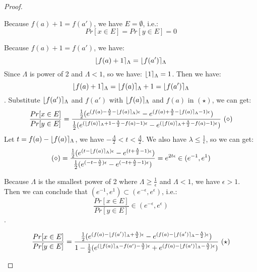 \documentclass[a4paper,11pt]{article}
\begin{document}
\begin{proof}
\begin{itemize}
\begin{itemize}
	Because $f(a) + 1 = f(a')$, we have $E = \emptyset$, i.e.:
	$$Pr[x \in E] = Pr[y \in E] = 0$$ 
	
	Because $f(a) + 1 = f(a')$, we have:
	$$\lfloor f(a) + 1 \rceil_{\Lambda} = \lfloor f(a') \rceil_{\Lambda}$$
	Since $\Lambda$ is power of 2 and $\Lambda < 1$, so we have: $\lfloor 1 \rceil_{\Lambda} = 1$. Then we have:
	$$\lfloor f(a) + 1 \rceil_{\Lambda} = \lfloor f(a) \rceil_{\Lambda} + 1 = \lfloor f(a') \rceil_{\Lambda} $$.
	Substitute $\lfloor f(a') \rceil_{\Lambda}$ and $f(a')$ with $\lfloor f(a) \rceil_{\Lambda}$ and $f(a)$ in $(\star)$, we can get:
	\[
	\frac{Pr[x \in E]}{Pr[y \in E]} 
	= \frac{
			\frac{1}{2}(
				e^{(f(a) - \frac{\Lambda}{2} - \lfloor f(a) \rceil_{\Lambda})\epsilon}
				- e^{(f(a) + \frac{\Lambda}{2} - \lfloor f(a) \rceil_{\Lambda} - 1)\epsilon})
			}
			{
			\frac{1}{2}(
				e^{(\lfloor f(a) \rceil_{\Lambda} + 1 - \frac{\Lambda}{2} - f(a) - 1)\epsilon}
				- e^{(\lfloor f(a) \rceil_{\Lambda} + \frac{\Lambda}{2}  - f(a) - 1)\epsilon})
			}~(\diamond) 
	\]
	Let $t = f(a) - \lfloor f(a) \rceil_{\Lambda}$, we have $-\frac{\Lambda}{2} < t < \frac{\Lambda}{2}$. We also have $\lambda \leq \frac{1}{\epsilon}$, so we can get:
	\[
	(\diamond) = 
	\frac{
		\frac{1}{2}(
			e^{(t - \lfloor f(a) \rceil_{\Lambda})\epsilon}
			- e^{(t + \frac{\Lambda}{2} - 1)\epsilon})
		}
		{
		\frac{1}{2}(
			e^{(-t - \frac{\Lambda}{2})\epsilon}
			- e^{(-t + \frac{\Lambda}{2} - 1)\epsilon})
		}
	= e^{2t\epsilon} \in (e^{-1}, e^1)
	\]
	
	Because $\Lambda$ is the smallest power of 2 where $\Lambda \geq \frac{1}{\epsilon}$ and $\Lambda < 1$, we have $\epsilon > 1$.
	Then we can conclude that $(e^{-1}, e^1) \subset (e^{-\epsilon}, e^{\epsilon})$, i.e.:
	$$\frac{Pr[x \in E]}{Pr[y \in E]} \in (e^{-\epsilon}, e^{\epsilon}) $$.
	\end{itemize}
	\[
	\frac{Pr[x \in E]}{Pr[y \in E]} 
	= \frac{
			\frac{1}{2}(
				e^{(f(a) - \round{f(a')}_{\Lambda} + \frac{\Lambda}{2})\epsilon}
				- e^{(f(a) - \round{f(a')}_{\Lambda} - \frac{\Lambda}{2})\epsilon})
			}
			{1 - {\frac{1}{2}(
				e^{(\round{f(a)}_{\Lambda} - f(a') - \frac{\Lambda}{2})\epsilon}
				+ e^{(f(a) - \round{f(a')}_{\Lambda} -\frac{\Lambda}{2})\epsilon})}
			}~(\star)
	\]


\end{itemize}
\end{proof}
\end{document}
